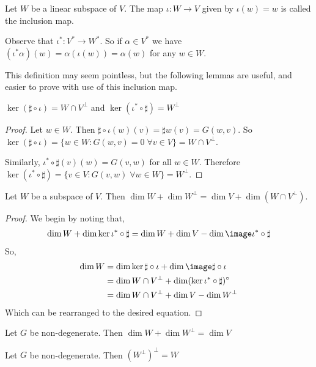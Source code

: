 \begin{defn}
    Let $W$ be a linear subspace of $V$. The map $\iota : W \to V$ given by $\iota(w)=w$ is called the inclusion map. 
\end{defn}
\begin{remark*}
    Observe that $\iota^*: V^* \to W^*$. So if $\alpha \in V^*$ we have $(\iota^* \alpha)(w) = \alpha(\iota(w))=\alpha(w)$ for any $w \in W$.

    This definition may seem pointless, but the following lemmas are useful, and easier to prove with use of this inclusion map.
\end{remark*}
\begin{lemma}  $\ker (\sharp \circ \iota) = W \cap V^\perp$ and $\ker (\iota^* \circ \sharp) = W^\perp$
\end{lemma}
\begin{proof}
    Let $w \in W$. Then $\sharp\circ\iota(w)(v) = \sharp w(v)=G(w,v)$. So $\ker (\sharp \circ \iota) = \{w \in W : G(w,v)=0 \;\forall v \in V\} = W\cap V^\perp$. 

    Similarly, $\iota^*\circ\sharp(v)(w) = G(v,w)$ for all $w \in W$. Therefore $\ker (\iota^*\circ \sharp) = \{v\in V : G(v,w) \;\forall w \in W\} = W^\perp$.
    
\end{proof}
\begin{thm}
    Let $W$ be a subspace of $V$. Then $\dim W + \dim W^\perp = \dim V + \dim (W\cap V^\perp)$.
\end{thm}
\begin{proof}
We begin by noting that,
    \begin{align*}
        \dim W + \dim \ker \iota^* \circ \sharp = \dim W + \dim V - \dim \image \iota^*\circ \sharp
    \end{align*}
So,
    \begin{align*}
        \dim W &= \dim \ker \sharp\circ\iota + \dim \image \sharp\circ\iota\\
        &= \dim W\cap V^\perp + \dim (\ker \iota^*\circ\sharp)^\circ\\
        &= \dim W \cap V^\perp + \dim V - \dim W^\perp
    \end{align*}
    Which can be rearranged to the desired equation.
\end{proof}
\begin{cor}
    Let $G$ be non-degenerate. Then $\dim W + \dim W^\perp = \dim V$
\end{cor}
\begin{cor}
    Let $G$ be non-degenerate. Then $(W^\perp)^\perp = W$
\end{cor}
